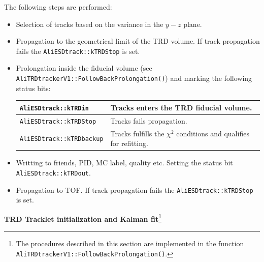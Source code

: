 \documentclass{alicetdr}
\begin{document}
The following steps are performed:
\begin{itemize}
\item[1.] Selection of tracks based on the variance in the $y-z$ plane.
\item[2.] Propagation to the geometrical limit of the TRD volume. If track
          propagation fails the {\tt AliESDtrack::kTRDStop} is set.
\item[3.] Prolongation inside the fiducial volume (see
          {\tt AliTRDtrackerV1::FollowBackProlonga\-tion()}) and marking
          the following status bits:
          \begin{center}
          \begin{tabular}{|l|l|}  \hline
          {\tt AliESDtrack::kTRDin}     & Tracks enters the TRD fiducial volume.  \\ \hline
          {\tt AliESDtrack::kTRDStop}   & Tracks fails propagation.               \\ \hline
          {\tt AliESDtrack::kTRDbackup} & Tracks fulfills the $\chi^{2}$
                                          conditions and qualifies for refitting. \\ \hline
          \end{tabular}
          \end{center}
\item[4.] Writting to friends, PID, MC label, quality etc. Setting the status bit
          {\tt AliESDtrack::kTRDout}.
\item[5.] Propagation to TOF. If track propagation fails the {\tt AliESDtrack::kTRDStop}
          is set.
\end{itemize}


\noindent
{\bf TRD Tracklet initialization and Kalman fit}\footnote{The procedures
described in this section are implemented in the function
{\tt AliTRDtrackerV1::FollowBackProlongation()}.}
\\
\end{document}
